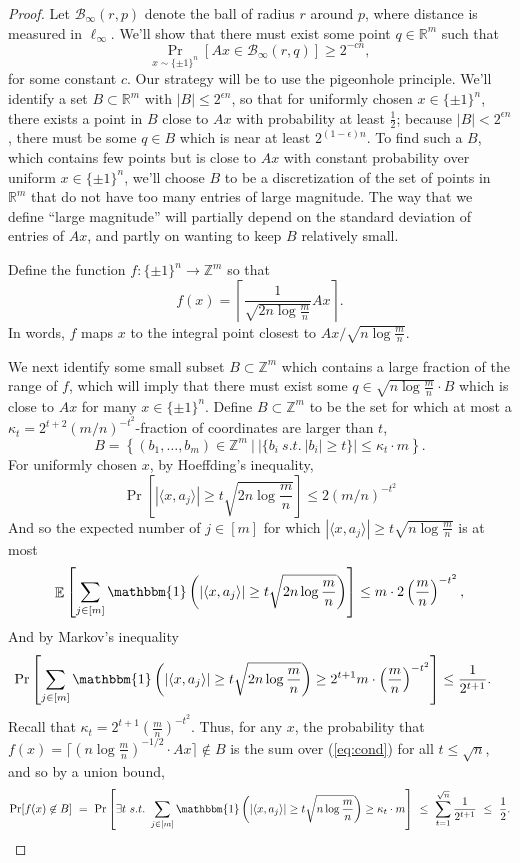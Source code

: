 \documentclass{article}
\theoremstyle{theorem}
\theoremstyle{definition}
\newcommand{\R}{\mathbb{R}}
\newcommand{\Z}{\mathbb{Z}}
\newcommand{\iprod}[1]{\langle #1 \rangle}
\newcommand{\E}{\mathop{\mathbb{E}}}
\newcommand{\cB}{\mathcal{B}}
\newcommand{\Ind}{\mathbbm{1}}
\begin{document}
\begin{proof}
    Let $\cB_{\infty}(r,p)$ denote the ball of radius $r$ around $p$, where distance is measured in $\ell_\infty$.
    We'll show that there must exist some point $q \in \R^m$ such that
    \[
	\Pr_{x\sim\{\pm 1\}^n}[ Ax \in \cB_{\infty}(r,q)] \ge 2^{-cn},
    \]
for some constant $c$.
    Our strategy will be to use the pigeonhole principle.
    We'll identify a set $B \subset \R^m$ with $|B| \le 2^{\epsilon n}$, so that for uniformly chosen $x \in \{\pm 1\}^n$, there exists a point in $B$ close to $Ax$ with probability at least $\frac{1}{2}$; because $|B| < 2^{\epsilon n}$, there must be some $q \in B$ which is near at least $2^{(1-\epsilon)n}$.
    To find such a $B$, which contains few points but is close to $Ax$ with constant probability over uniform $x \in \{\pm 1\}^n$, we'll choose $B$ to be a discretization of the set of points in $\R^m$ that do not have too many entries of large magnitude.
    The way that we define ``large magnitude'' will partially depend on the standard deviation of entries of $Ax$, and partly on wanting to keep $B$ relatively small.

    Define the function $f:\{\pm 1\}^n \to \Z^m$ so that
    \[
	f(x) = \left\lceil \frac{1}{\sqrt {2n\log \frac{m}{n}}} Ax\right\rceil.
    \]
In words, $f$ maps $x$ to the integral point closest to $Ax/\sqrt{n\log \frac{m}{n}}$.

We next identify some small subset $B \subset \Z^m$ which contains a large fraction of the range of $f$, which will imply that there must exist some $q \in \sqrt{n\log\frac{m}{n}}\cdot B$ which is close to $Ax$ for many $x \in \{\pm 1\}^n$.
    Define $B \subset \Z^m$ to be the set for which at most a $\kappa_t = 2^{t+2} (m/n)^{-t^2}$-fraction of coordinates are larger than $t$,
    \[
	B = \left\{(b_1,\ldots,b_m) \in \Z^m ~|~ |\{b_i ~s.t.~ |b_i| \ge t\}| \le \kappa_t \cdot m\right\}.
    \]
    For uniformly chosen $x$, by Hoeffding's inequality,
    \[
	\Pr\left[ |\iprod{x,a_j}| \ge t \sqrt{2n\log\frac{m}{n}} \right]\le 2\left(m/n\right)^{-t^2}
    \]
And so the expected number of $j \in [m]$ for which $|\iprod{x,a_j}| \ge t\sqrt{n\log\frac{m}{n}}$ is at most
    \[
	\E\left[\sum_{j\in[m]} \Ind\left(\left|\iprod{x,a_j}\right| \ge t\sqrt{2n\log\frac{m}{n}}\right) \right] \le m \cdot 2\left(\frac{m}{n}\right)^{-t^2},
    \]
    And by Markov's inequality
    \begin{align}
	\Pr\left[\sum_{j\in[m]} \Ind\left(\left|\iprod{x,a_j}\right| \ge t\sqrt{2n\log\frac{m}{n}}\right) \ge 2^{t+1} m \cdot \left(\frac{m}{n}\right)^{-t^2}\right]
	&\le \frac{1}{2^{t+1}}.\label{eq:cond}
    \end{align}
    Recall that $\kappa_t = 2^{t+1} \left(\frac{m}{n}\right)^{-t^2}$.
    Thus, for any $x$, the probability that $f(x) = \lceil (n\log\frac{m}{n})^{-1/2} \cdot Ax\rceil \not\in B$ is the sum over (\ref{eq:cond}) for all $t \le \sqrt{n}$, and so by a union bound,
    \begin{align*}
	\Pr[f(x) \not \in B]
	~=~ \Pr\left[\exists t ~s.t.~ \sum_{j \in [m]} \Ind\left(|\iprod{x,a_j}| \ge t\sqrt{n\log\frac{m}{n}}\right) \ge \kappa_t \cdot m\right]
	~\le~ \sum_{t=1}^{\sqrt{n}} \frac{1}{2^{t+1}}
	~\le~ \frac{1}{2}.
    \end{align*}


\end{proof}
\end{document}
